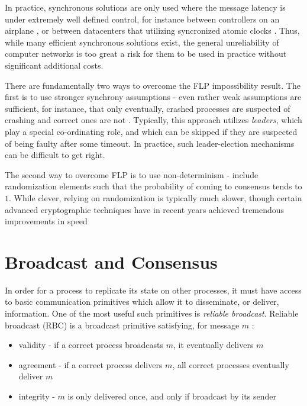 In practice, synchronous solutions are only used where the message latency is under 
extremely well defined control, for instance between controllers on an airplane \cite{hoyme1993safebus},
or between datacenters that utilizing syncronized atomic clocks \cite{corbett2013spanner}.
Thus, while many efficient synchronous solutions exist,
the general unreliability of computer networks is too great a risk for them to be used in practice
without significant additional costs.

There are fundamentally two ways to overcome the FLP impossibility result.
The first is to use stronger synchrony assumptions - 
even rather weak assumptions are sufficient, 
for instance, that only eventually, 
crashed processes are suspected of crashing and correct ones are not \cite{chandra1996unreliable}.
Typically, this approach utilizes \emph{leaders}, 
which play a special co-ordinating role, 
and which can be skipped if they are suspected of being faulty after some timeout.
In practice, such leader-election mechanisms can be difficult to get right.

The second way to overcome FLP is to use non-determinism - 
include randomization elements such that
the probability of coming to consensus tends to $1$.
While clever, relying on randomization is typically much slower, 
though certain advanced cryptographic techniques have in recent years
achieved tremendous improvements in speed \cite{honeybadger}


\section{Broadcast and Consensus}

In order for a process to replicate its state on other processes, 
it must have access to basic communication primitives which allow it to disseminate, or deliver, information.
One of the most useful such primitives is \emph{reliable broadcast}.
Reliable broadcast (RBC) is a broadcast primitive satisfying, for message $m$ \cite{chandra1996unreliable}:

\begin{itemize}
\item validity - if a correct process broadcasts $m$, it eventually delivers $m$
\item agreement - if a correct process delivers $m$, all correct processes eventually deliver $m$
\item integrity - $m$ is only delivered once, and only if broadcast by its sender
\end{itemize}

